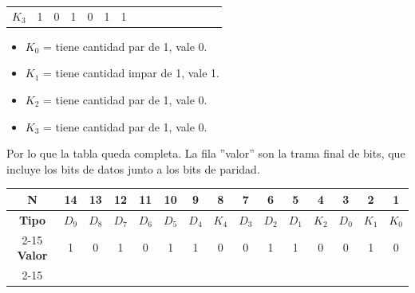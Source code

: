 \begin{center}
\begin{tabular}{c|cccccccccccccc}
\cellcolor[HTML]{9AFF99}$K_3$          & \cellcolor[HTML]{96FFFB}1 & \cellcolor[HTML]{96FFFB}0 & \cellcolor[HTML]{96FFFB}1 & \cellcolor[HTML]{96FFFB}0 & \cellcolor[HTML]{96FFFB}1 & \cellcolor[HTML]{96FFFB}1 & \cellcolor[HTML]{96FFFB} &                           &                           &                           &                          &                           &                          &                         
\end{tabular}
\end{center}
\begin{itemize}[nosep]
    \item $K_0$ = tiene cantidad par de 1, vale 0.
    \item $K_1$ = tiene cantidad impar de 1, vale 1.
    \item $K_2$ = tiene cantidad par de 1, vale 0.
    \item $K_3$ = tiene cantidad par de 1, vale 0.
\end{itemize}\vspace{10pt}
\sangria{}Por lo que la tabla queda completa. La fila ''valor'' son la trama final de bits, que incluye los bits de datos junto a los bits de paridad.
\begin{center}
\begin{tabular}{c|cccccccccccccc}
\rowcolor[HTML]{FFFFC7} 
\cellcolor[HTML]{FCFF2F}\textbf{N}     & 14    & 13    & 12    & 11    & 10    & 9     & 8     & 7     & 6     & 5     & 4     & 3     & 2     & 1     \\ \hline
\rowcolor[HTML]{CBCEFB} 
\cellcolor[HTML]{9698ED}\textbf{Tipo}  & $D_9$ & $D_8$ & $D_7$ & $D_6$ & $D_5$ & $D_4$ & $K_4$ & $D_3$ & $D_2$ & $D_1$ & $K_2$ & $D_0$ & $K_1$ & $K_0$ \\ \cline{2-15} 
\rowcolor[HTML]{FFCCC9} 
\cellcolor[HTML]{FD6864}\textbf{Valor} & 1     & 0     & 1     & 0     & 1     & 1     & 0     & 0     & 1     & 1     & 0     & 0     & 1     & 0     \\ \cline{2-15} 
\end{tabular}
\end{center}
